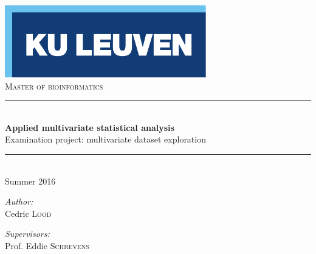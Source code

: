 \begin{titlepage}
  \begin{center}
    
    \includegraphics[scale=1.5]{figures/kuleuven_logo.pdf}~\\[4.5cm]
    \textsc{\Large Master of bioinformatics}\\[0.5cm]

    \rule{\linewidth}{0.3mm}\\[0.4cm]
    {\huge \bfseries Applied multivariate statistical analysis} \\[0.4cm]
    {\large Examination project: multivariate dataset exploration} \\[0.4cm]
    \rule{\linewidth}{0.3mm}\\[0.4cm]
    {\large Summer 2016} \\[1.0cm]
    
    \begin{minipage}{0.4\textwidth}
      \begin{flushleft} \large
        \emph{Author:}\\
	Cedric \textsc{Lood}
      \end{flushleft}
    \end{minipage}
    \begin{minipage}{0.4\textwidth}
      \begin{flushright} \large
        \emph{Supervisors:} \\
        Prof. Eddie \textsc{Schrevens}\\
        \hfill \newline 
      \end{flushright}
    \end{minipage}
    
    \vfill


\end{center}
\end{titlepage}
